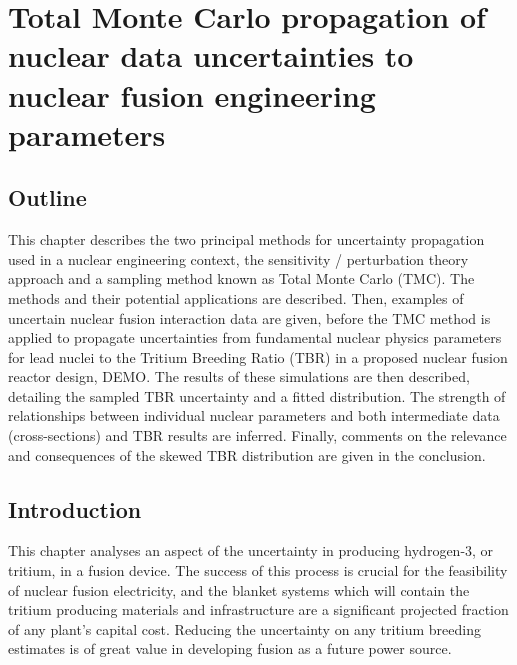 
\chapter{Total Monte Carlo propagation of nuclear data uncertainties to nuclear fusion engineering parameters} %
\label{chap:tmc}

\ifpdf
    \graphicspath{{Chapter1/Figs/Raster/}{Chapter1/Figs/PDF/}{Chapter1/Figs/}}
\else
    \graphicspath{{Chapter1/Figs/Vector/}{Chapter1/Figs/}}
\fi


\section{Outline}
This chapter describes the two principal methods for uncertainty propagation used in a nuclear engineering context, the sensitivity / perturbation theory approach and a sampling method known as Total Monte Carlo (TMC). The methods and their potential applications are described. Then, examples of uncertain nuclear fusion interaction data are given, before the TMC method is applied to propagate uncertainties from fundamental nuclear physics parameters for lead nuclei to the Tritium Breeding Ratio (TBR) in a proposed nuclear fusion reactor design, DEMO. The results of these simulations are then described, detailing the sampled TBR uncertainty and a fitted distribution. The strength of relationships between individual nuclear parameters and both intermediate data (cross-sections) and TBR results are inferred. Finally, comments on the relevance and consequences of the skewed TBR distribution are given in the conclusion.


\section{Introduction}
\label{introduction}
This chapter analyses an aspect of the uncertainty in producing hydrogen-3, or tritium, in a fusion device. The success of this process is crucial for the feasibility of nuclear fusion electricity, and the blanket systems which will contain the tritium producing materials and infrastructure are a significant projected fraction of any plant's capital cost. Reducing the uncertainty on any tritium breeding estimates is of great value in developing fusion as a future power source.

